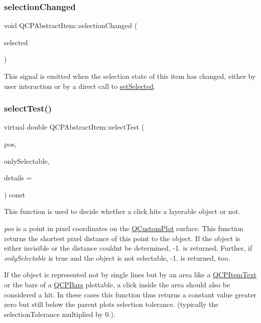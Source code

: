 \subsubsection{\texorpdfstring{selection\+Changed}{selectionChanged}}
{\footnotesize\ttfamily void Q\+C\+P\+Abstract\+Item\+::selection\+Changed (\begin{DoxyParamCaption}\item[{bool}]{selected }\end{DoxyParamCaption})\hspace{0.3cm}{\ttfamily [signal]}}

This signal is emitted when the selection state of this item has changed, either by user interaction or by a direct call to \hyperlink{classQCPAbstractItem_a203de94ad586cc44d16c9565f49d3378}{set\+Selected}. \mbox{\label{classQCPAbstractItem_ae41d0349d68bb802c49104afd100ba2a}} 
\subsubsection{\texorpdfstring{select\+Test()}{selectTest()}}
{\footnotesize\ttfamily virtual double Q\+C\+P\+Abstract\+Item\+::select\+Test (\begin{DoxyParamCaption}\item[{const Q\+PointF \&}]{pos,  }\item[{bool}]{only\+Selectable,  }\item[{Q\+Variant $\ast$}]{details = {} }\end{DoxyParamCaption}) const\hspace{0.3cm}{\ttfamily [pure virtual]}}

This function is used to decide whether a click hits a layerable object or not.

{\itshape pos} is a point in pixel coordinates on the \hyperlink{classQCustomPlot}{Q\+Custom\+Plot} surface. This function returns the shortest pixel distance of this point to the object. If the object is either invisible or the distance couldn\textquotesingle{}t be determined, -\/1. is returned. Further, if {\itshape only\+Selectable} is true and the object is not selectable, -\/1. is returned, too.

If the object is represented not by single lines but by an area like a \hyperlink{classQCPItemText}{Q\+C\+P\+Item\+Text} or the bars of a \hyperlink{classQCPBars}{Q\+C\+P\+Bars} plottable, a click inside the area should also be considered a hit. In these cases this function thus returns a constant value greater zero but still below the parent plot\textquotesingle{}s selection tolerance. (typically the selection\+Tolerance multiplied by 0.).

